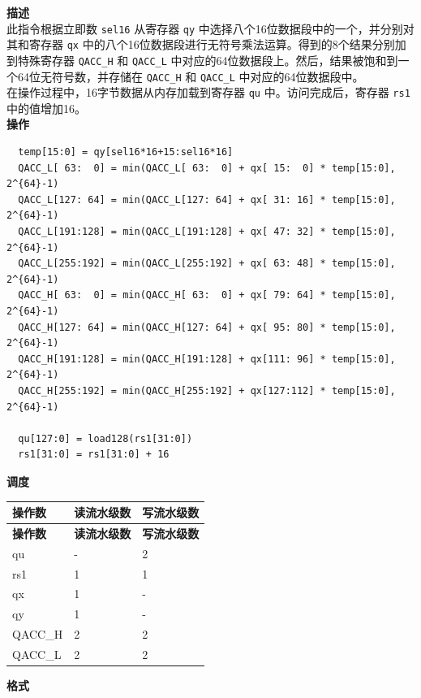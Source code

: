 \textbf{描述}\\
此指令根据立即数 \lstinline{sel16} 从寄存器 \lstinline{qy} 中选择八个16位数据段中的一个，并分别对其和寄存器 \lstinline{qx} 中的八个16位数据段进行无符号乘法运算。得到的8个结果分别加到特殊寄存器 \lstinline{QACC_H} 和 \lstinline{QACC_L} 中对应的64位数据段上。然后，结果被饱和到一个64位无符号数，并存储在 \lstinline{QACC_H} 和 \lstinline{QACC_L} 中对应的64位数据段中。\\
在操作过程中，16字节数据从内存加载到寄存器 \lstinline{qu} 中。访问完成后，寄存器 \lstinline{rs1} 中的值增加16。\\
\textbf{操作}
\begin{lstlisting}
  temp[15:0] = qy[sel16*16+15:sel16*16]
  QACC_L[ 63:  0] = min(QACC_L[ 63:  0] + qx[ 15:  0] * temp[15:0], 2^{64}-1)
  QACC_L[127: 64] = min(QACC_L[127: 64] + qx[ 31: 16] * temp[15:0], 2^{64}-1)
  QACC_L[191:128] = min(QACC_L[191:128] + qx[ 47: 32] * temp[15:0], 2^{64}-1)
  QACC_L[255:192] = min(QACC_L[255:192] + qx[ 63: 48] * temp[15:0], 2^{64}-1)
  QACC_H[ 63:  0] = min(QACC_H[ 63:  0] + qx[ 79: 64] * temp[15:0], 2^{64}-1)
  QACC_H[127: 64] = min(QACC_H[127: 64] + qx[ 95: 80] * temp[15:0], 2^{64}-1)
  QACC_H[191:128] = min(QACC_H[191:128] + qx[111: 96] * temp[15:0], 2^{64}-1)
  QACC_H[255:192] = min(QACC_H[255:192] + qx[127:112] * temp[15:0], 2^{64}-1)

  qu[127:0] = load128(rs1[31:0])
  rs1[31:0] = rs1[31:0] + 16
\end{lstlisting}

\textbf{调度}\\
\begin{longtable}[c]{|l|l|l|}
    \hline
    \rowcolor{lightgray}
    \textbf{操作数} & \textbf{读流水级数} & \textbf{写流水级数} \\\hline
    \endfirsthead
    \hline
    \rowcolor{lightgray}
     \textbf{操作数} & \textbf{读流水级数} & \textbf{写流水级数} \\\hline
    \endhead
    \hline
    \endfoot

    qu & - & 2 \\\hline
    rs1 & 1 & 1 \\\hline
     qx & 1 & - \\\hline
     qy & 1 & - \\\hline
     QACC\_H & 2 & 2 \\\hline
     QACC\_L & 2 & 2

\end{longtable}

\textbf{格式}\\

